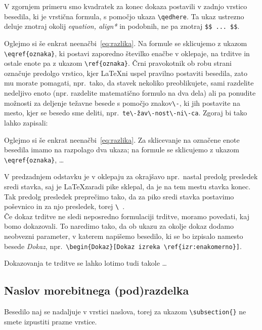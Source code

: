 \documentclass[mat1]{fmfdelo}
\begin{document}
V zgornjem primeru smo kvadratek za konec dokaza postavili v zadnjo vrstico
besedila, ki je vrstična formula, s pomočjo ukaza \verb|\qedhere|.  Ta ukaz
ustrezno deluje znotraj okolij \emph{equation, align*} in podobnih, ne pa
znotraj \verb|$$ ... $$|.

Oglejmo si še enkrat neenačbi~\eqref{eq:razlika}. Na formule se sklicujemo z
ukazom \verb|\eqref{oznaka}|, ki postavi zaporedno številko enačbe
v oklepaje, na trditve in ostale enote pa z ukazom \verb|\ref{oznaka}|. Črni
pravokotnik ob robu strani označuje predolgo vrstico, kjer \LaTeX ni uspel
pravilno postaviti besedila, zato mu morate pomagati, npr.\ tako, da stavek
nekoliko preoblikujete, sami razdelite nedeljivo enoto (npr. razdelite
matematično formulo na dva dela) ali pa ponudite možnosti za deljenje težavne
besede s pomočjo znakov\verb|\-|, ki jih postavite na mesto, kjer se besedo sme
deliti, npr.\  \verb|te\-žav\-nost\-ni\-ca|. Zgoraj bi tako lahko zapisali:

Oglejmo si še enkrat neenačbi~\eqref{eq:razlika}. Za sklicevanje na označene
enote besedila imamo na razpolago dva ukaza; na formule se sklicujemo z ukazom
\verb|\eqref{oznaka}|, \dots

V predzadnjem odstavku je v oklepaju za okrajšavo npr.\ nastal predolg
presledek sredi stavka, saj je \LaTeX zaradi pike sklepal, da je na tem mestu
stavka konec. Tak predolg presledek preprečimo tako, da za piko sredi stavka
postavimo poševnico in za njo presledek, torej \verb|\ |.\\

Če dokaz trditve ne sledi neposredno formulaciji trditve, moramo povedati, kaj
bomo dokazovali. To naredimo tako, da ob ukazu za okolje dokaz dodamo neobvezni
parameter,  v katerem napišemo besedilo, ki se bo izpisalo namesto besede
\emph{Dokaz}, npr.\ \verb|\begin{Dokaz}[Dokaz izreka \ref{izr:enakomerno}]|.

\begin{dokaz}
  Dokazovanja te trditve se lahko lotimo tudi takole \ldots
\end{dokaz}

\subsection{Naslov morebitnega (pod)razdelka} Besedilo naj se nadaljuje v vrstici naslova, torej za ukazom \verb|\subsection{}| ne smete izpustiti prazne vrstice.
\end{document}
